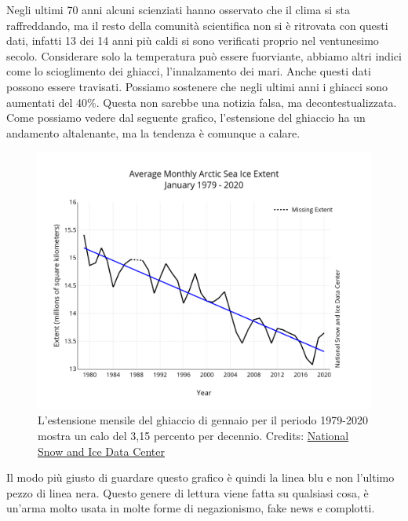 \documentclass[12pt]{book} %
\begin{document}
Negli ultimi 70 anni alcuni scienziati hanno osservato che il clima si sta raffreddando, ma il resto della comunità
scientifica non si è ritrovata con questi dati, infatti 13 dei 14 anni più caldi si sono verificati proprio nel
ventunesimo secolo. Considerare solo la temperatura può essere fuorviante, abbiamo altri indici come lo scioglimento
dei ghiacci, l'innalzamento dei mari. Anche questi dati possono essere travisati. Possiamo sostenere che negli ultimi anni i ghiacci sono aumentati del 40\%. Questa non sarebbe una notizia falsa, ma decontestualizzata. Come possiamo vedere dal seguente grafico, l'estensione del ghiaccio ha un andamento altalenante, ma la tendenza è comunque a calare.

\needspace{4cm}
\begin{figure}[H]
  \centering
  \includegraphics[width=0.95\linewidth]{images/Libro-img021.png}
  \caption{L'estensione mensile del ghiaccio di gennaio per il
periodo 1979-2020 mostra un calo del 3,15 percento per decennio. Credits: \href{https://nsidc.org/arcticseaicenews/2020/02/}{National Snow and Ice Data Center}}
\end{figure}

Il modo più giusto di guardare questo grafico è quindi la linea blu e non l'ultimo pezzo di linea nera. Questo genere di lettura viene fatta su qualsiasi cosa, è un'arma molto usata in molte forme di negazionismo, fake news e complotti.
\end{document}
